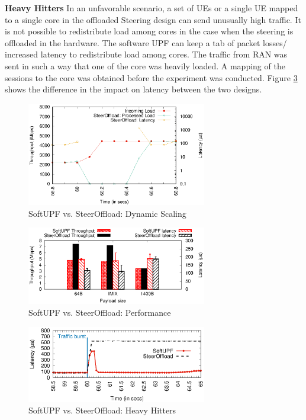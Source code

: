  \textbf{Heavy Hitters} In an unfavorable scenario, a set of UEs or  a single UE mapped
  to a single core in the offloaded Steering design can send unusually high traffic. It
   is not possible to redistribute load among cores in the case when the steering is
    offloaded in the hardware. The software UPF can keep a tab of packet losses/
    increased latency to redistribute load among cores. The traffic from RAN was sent in such a way that one of the core was heavily loaded. A  mapping of the sessions to the core was obtained before the experiment was conducted.
 Figure \ref{fig:HeavyHitter} shows the difference in the  impact on latency between the  two designs. 
\begin{figure}[htbp]
	\centering
	\includegraphics[width=0.7\textwidth]{fig/dynScaling_SteerOffload.eps}
	\setlength{\belowcaptionskip}{-12pt}
	\caption{SoftUPF vs. SteerOffload: Dynamic Scaling}
	\label{fig:dynamicScaling}
\end{figure}
\begin{figure}[htbp]
	\centering
	\includegraphics[width=0.7\textwidth]{fig/pipelineVsRTT.eps}
	\setlength{\belowcaptionskip}{-12pt}

	\caption{SoftUPF vs. SteerOffload: Performance}
	
	\label{fig:UPFABperformance}
\end{figure}
\begin{figure}[htbp]
	\centering
	\includegraphics[width=0.7\textwidth]{fig/heavyHitter.eps}
	\setlength{\belowcaptionskip}{-12pt}
	\caption{SoftUPF vs. SteerOffload: Heavy Hitters}
	\label{fig:HeavyHitter}
\end{figure}

